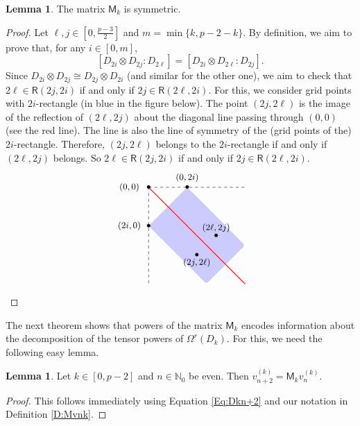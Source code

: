 \documentclass[12pt,reqno]{amsart}
\newcommand{\NN}{\mathbb{N}}
\newcommand{\Rect}{\mathsf{R}}
\newcommand{\M}{\mathsf{M}}
\theoremstyle{definition}
\newtheorem{lem}[thm]{Lemma}
\numberwithin{equation}{section}
\begin{document}
\begin{lem}\label{L:MkSymm}
  The matrix $\M_k$ is symmetric.
\end{lem}
\begin{proof}
   Let $\ell,j\in [0,\frac{p-3}{2}]$ and $m=\min\{k,p-2-k\}$. By definition, we aim to prove that, for any $i\in [0,m]$, \[[D_{2i}\otimes D_{2j}:D_{2\ell}]=[D_{2i}\otimes D_{2\ell}:D_{2j}].\] Since $D_{2i}\otimes D_{2j}\cong D_{2j}\otimes D_{2i}$ (and similar for the other one), we aim to check that $2\ell\in \Rect(2j,2i)$ if and only if $2j\in\Rect(2\ell,2i)$. For this, we consider grid points with $2i$-rectangle (in blue in the figure below). The point $(2j,2\ell)$ is the image of the reflection of $(2\ell,2j)$ about the diagonal line passing through $(0,0)$ (see the red line). The line is also the line of symmetry of the (grid points of the) $2i$-rectangle. Therefore, $(2j,2\ell)$ belongs to the $2i$-rectangle if and only if $(2\ell,2j)$ belongs. So $2\ell\in \Rect(2j,2i)$ if and only if $2j\in\Rect(2\ell,2i)$.
\[\small{
\begin{tikzpicture}[xscale=.35,yscale=.35]
\fill[blue,rounded corners=1mm,opacity=0.2] (0,0)--(4,4)--(10,-2)--(6,-6)--(0,0)--(4,4)--cycle;

\draw[thick,red] (0,4)--(10,-6);
\node at (0,4) {$\bullet$};
\node at (4,4) {$\bullet$};
\node at (0,0) {$\bullet$};
\draw[dashed] (0,4)--(10,4);
\draw[dashed] (0,4)--(0,-6);

\node at (4,5) {$(0,2i)$};
\node at (-2,0) {$(2i,0)$};
\node at (-2,4) {$(0,0)$};
\node at (5,-3) {$\bullet$};
\node at (5,-3.8) {$(2j,2\ell)$};
\node at (7,-1) {$\bullet$};
\node at (7,-.2) {$(2\ell,2j)$};
\end{tikzpicture}}\]
\end{proof}

The next theorem shows that powers of the matrix $\M_k$ encodes information about the decomposition of the tensor powers of $\Omega^r(D_k)$. For this, we need the following easy lemma. 

\begin{lem}\label{L:vnk}
    Let $k\in [0,p-2]$ and $n\in\NN_0$ be even. Then $v_{n+2}^{(k)}=\M_kv_n^{(k)}$.
\end{lem}
\begin{proof}
    This follows immediately using Equation \ref{Eq:Dkn+2} and our notation in Definition \ref{D:Mvnk}.
\end{proof}
\end{document}

